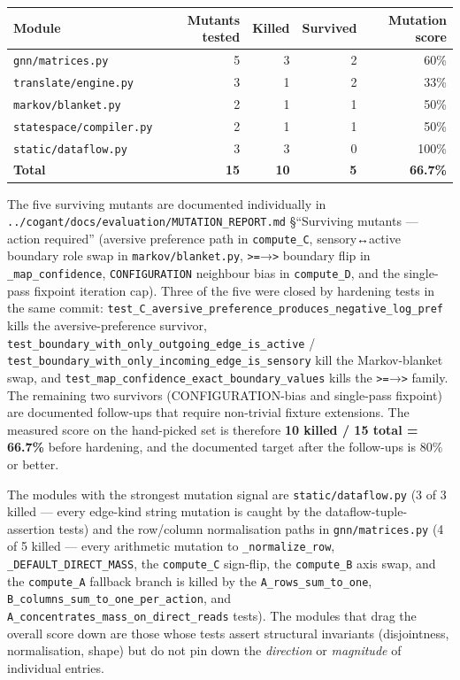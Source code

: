 \documentclass[
]{article}
\newcounter{none} %
\begin{document}
{\def\LTcaptype{none} %
\begin{longtable}[]{@{}lrrrr@{}}
\toprule\noalign{}
Module & Mutants tested & Killed & Survived & Mutation score \\
\midrule\noalign{}
\endhead
\bottomrule\noalign{}
\endlastfoot
\texttt{gnn/matrices.py} & 5 & 3 & 2 & 60\% \\
\texttt{translate/engine.py} & 3 & 1 & 2 & 33\% \\
\texttt{markov/blanket.py} & 2 & 1 & 1 & 50\% \\
\texttt{statespace/compiler.py} & 2 & 1 & 1 & 50\% \\
\texttt{static/dataflow.py} & 3 & 3 & 0 & 100\% \\
\textbf{Total} & \textbf{15} & \textbf{10} & \textbf{5} &
\textbf{66.7\%} \\
\end{longtable}
}

The five surviving mutants are documented individually in
\texttt{../cogant/docs/evaluation/MUTATION\_REPORT.md} §``Surviving
mutants --- action required'' (aversive preference path in
\texttt{compute\_C}, sensory↔active boundary role swap in
\texttt{markov/blanket.py},
\texttt{\textgreater{}=}→\texttt{\textgreater{}} boundary flip in
\texttt{\_map\_confidence}, \texttt{CONFIGURATION} neighbour bias in
\texttt{compute\_D}, and the single-pass fixpoint iteration cap). Three
of the five were closed by hardening tests in the same commit:
\texttt{test\_C\_aversive\_preference\_produces\_negative\_log\_pref}
kills the aversive-preference survivor,
\texttt{test\_boundary\_with\_only\_outgoing\_edge\_is\_active} /
\texttt{test\_boundary\_with\_only\_incoming\_edge\_is\_sensory} kill
the Markov-blanket swap, and
\texttt{test\_map\_confidence\_exact\_boundary\_values} kills the
\texttt{\textgreater{}=}→\texttt{\textgreater{}} family. The remaining
two survivors (CONFIGURATION-bias and single-pass fixpoint) are
documented follow-ups that require non-trivial fixture extensions. The
measured score on the hand-picked set is therefore \textbf{10 killed /
15 total = 66.7\%} before hardening, and the documented target after the
follow-ups is 80\% or better.

The modules with the strongest mutation signal are
\texttt{static/dataflow.py} (3 of 3 killed --- every edge-kind string
mutation is caught by the dataflow-tuple-assertion tests) and the
row/column normalisation paths in \texttt{gnn/matrices.py} (4 of 5
killed --- every arithmetic mutation to \texttt{\_normalize\_row},
\texttt{\_DEFAULT\_DIRECT\_MASS}, the \texttt{compute\_C} sign-flip, the
\texttt{compute\_B} axis swap, and the \texttt{compute\_A} fallback
branch is killed by the \texttt{A\_rows\_sum\_to\_one},
\texttt{B\_columns\_sum\_to\_one\_per\_action}, and
\texttt{A\_concentrates\_mass\_on\_direct\_reads} tests). The modules
that drag the overall score down are those whose tests assert structural
invariants (disjointness, normalisation, shape) but do not pin down the
\emph{direction} or \emph{magnitude} of individual entries.
\end{document}
